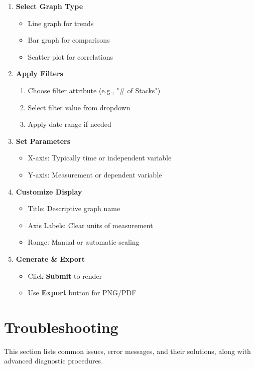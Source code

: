 \documentclass[12pt]{article}
\begin{document}
\begin{enumerate}
    \item \textbf{Select Graph Type}
    \begin{itemize}
        \item Line graph for trends
        \item Bar graph for comparisons
        \item Scatter plot for correlations
    \end{itemize}
    
    \item \textbf{Apply Filters}
    \begin{enumerate}
        \item Choose filter attribute (e.g., "\# of Stacks")
        \item Select filter value from dropdown
        \item Apply date range if needed
    \end{enumerate}
    
    \item \textbf{Set Parameters}
    \begin{itemize}
        \item X-axis: Typically time or independent variable
        \item Y-axis: Measurement or dependent variable
    \end{itemize}
    
    \item \textbf{Customize Display}
    \begin{itemize}
        \item Title: Descriptive graph name
        \item Axis Labels: Clear units of measurement
        \item Range: Manual or automatic scaling
    \end{itemize}
    
    \item \textbf{Generate \& Export}
    \begin{itemize}
        \item Click \textbf{Submit} to render
        \item Use \textbf{Export} button for PNG/PDF
    \end{itemize}
\end{enumerate}

\section{Troubleshooting}

This section lists common issues, error messages, and their solutions, along
with advanced diagnostic procedures.
\end{document}
